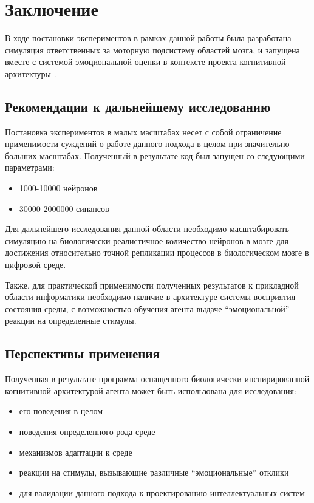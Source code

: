\cleardoublepage
{}
{}
\chapter*{Заключение}
\label{chap:conclusion}
В ходе постановки экспериментов в рамках данной работы была разработана симуляция ответственных за моторную подсистему областей мозга, и запущена вместе с системой эмоциональной оценки в контексте проекта когнитивной архитектуры .

\section{Рекомендации к дальнейшему исследованию}
Постановка экспериментов в малых масштабах несет с собой ограничение применимости суждений о работе данного подхода в целом при значительно больших масштабах. Полученный в результате код был запущен со следующими параметрами:
\begin{itemize}
	\item 1000-10000 нейронов
	\item 30000-2000000 синапсов
\end{itemize}
Для дальнейшего исследования данной области необходимо масштабировать симуляцию на биологически реалистичное количество нейронов в мозге для достижения относительно точной репликации процессов в биологическом мозге в цифровой среде.

Также, для практической применимости полученных результатов к прикладной области информатики необходимо наличие в архитектуре системы восприятия состояния среды, с возможностью обучения агента выдаче \enquote{эмоциональной} реакции на определенные стимулы.

\section{Перспективы применения}
Полученная в результате программа оснащенного биологически инспирированной когнитивной архитектурой агента может быть использована для исследования:
\begin{itemize}
	\item его поведения в целом
	\item поведения определенного рода среде 
	\item механизмов адаптации к среде
	\item реакции на стимулы, вызывающие различные \enquote{эмоциональные} отклики
	\item для валидации	данного подхода к проектированию интеллектуальных систем
\end{itemize}

